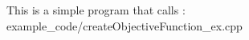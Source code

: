 \apisummary{
    
}

\begin{apidefinition}

\begin{Csynopsis}
    
\end{Csynopsis}

\begin{Cppsynopsis}
    
\end{Cppsynopsis}


\begin{apiarguments}
    \apiargument{}{}{}
\end{apiarguments}

\apidescription{
        
}

\apireturnvalues{
    
}      

\apinotes{
    
}

\begin{apiexamples}

\apicppexample
    { This is a simple program that calls : } 
    { example_code/createObjectiveFunction_ex.cpp} 
    {}

\end{apiexamples}

\end{apidefinition}
